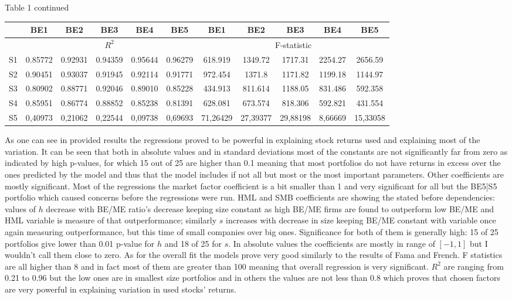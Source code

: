 \documentclass[a4paper,12pt]{article} %
\begin{document}
	\begin{landscape}
		\begin{center}
			Table 1 continued
		\end{center}
		\begin{longtable}{c|ccccc|ccccc|} 
			& BE1 & BE2& BE3& BE4&BE5& BE1 & BE2& BE3& BE4&BE5\\
			\hline
			& \multicolumn{5}{c|}{$R^2$} & \multicolumn{5}{c|}{F-statistic}\\
			\hline
			S1& 0.85772 &  0.92931 &  0.94359 &  0.95644 &  0.96279 &  618.919 &  1349.72 &  1717.31 &  2254.27 &  2656.59\\
			S2& 0.90451 &   0.93037 &  0.91945 &  0.92114 &  0.91771 &  972.454 &   1371.8 &  1171.82 &  1199.18 &  1144.97\\
			S3& 0.80902 &  0.88771 &  0.92046 &  0.89010 &  0.85228 &  434.913 &  811.614 &  1188.05 &  831.486 &  592.358\\
			S4& 0.85951 &  0.86774 &  0.88852 &  0.85238 &  0.81391 &  628.081 &  673.574 &  818.306 &  592.821 &  431.554\\
			S5& 0,40973&	0,21062&	0,22544&	0,09738&	0,69693&	71,26429&	27,39377&	29,88198&	8,66669&	15,33058
		\end{longtable}
	\end{landscape}
	\addtocounter{table}{-2}
	\newpage
As one can see in provided results the regressions proved to be powerful in explaining stock returns used and explaining most of the variation. It can be seen that both in absolute values and in standard deviations most of the constants are not significantly far from zero as indicated by high p-values, for which 15 out of 25 are higher than 0.1 meaning that most portfolios do not have returns in excess over the ones predicted by the model and thus that the model includes if not all but most or the most important parameters. Other coefficients are mostly significant. Most of the regressions the market factor coefficient is a bit smaller than 1 and very significant for all but the BE5|S5 portfolio which caused concerns before the regressions were run.
HML and SMB coefficients are showing the stated before dependencies: values of $h$ decrease with BE/ME ratio's decrease keeping size constant as high BE/ME firms are found to outperform low BE/ME and HML variable is measure of that outperformance; similarly $s$ increases with decrease in size keeping BE/ME constant with variable once again measuring outperformance, but this time of small companies over big ones. Significance for both of them is generally high: 15 of 25 portfolios give lower than 0.01 p-value for $h$ and 18 of 25 for $s$. In absolute values the coefficients are mostly in range of $[-1, 1]$ but I wouldn't call them close to zero. As for the overall fit the models prove very good similarly to the results of Fama and French. F statistics are all higher than 8 and in fact most of them are greater than 100 meaning that overall regression is very significant. $R^2$ are ranging from 0.21 to 0.96 but the low ones are in smallest size portfolios and in others the values are not less than 0.8 which proves that chosen factors are very powerful in explaining variation in used stocks' returns. 
\end{document}
